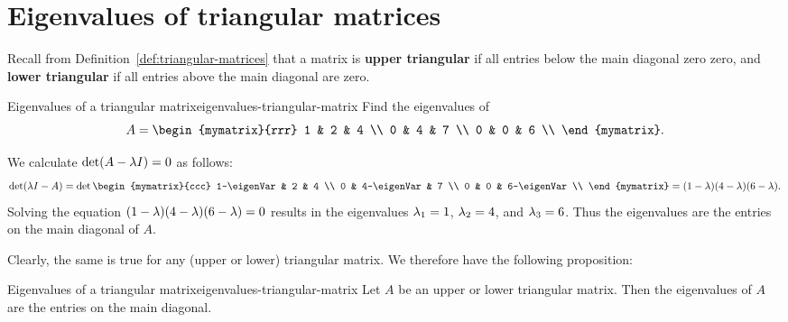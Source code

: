 \section{Eigenvalues of triangular matrices}

Recall from Definition~\ref{def:triangular-matrices} that a matrix is
\textbf{upper triangular} if all entries below the main diagonal zero
zero, and \textbf{lower triangular} if all entries above the main
diagonal are zero. 

\begin{example}{Eigenvalues of a triangular matrix}{eigenvalues-triangular-matrix}
  Find the eigenvalues of
  \begin{equation*}
    A=\begin{mymatrix}{rrr}
      1 & 2 & 4 \\
      0 & 4 & 7 \\
      0 & 0 & 6 \\
    \end{mymatrix}.
  \end{equation*}
\end{example}

\begin{solution}
  We calculate $\det(A - \lambda I) = 0$ as follows:
  \begin{eqnarray*}
    \det (\eigenVar I - A) =
    \det \begin{mymatrix}{ccc}
      1-\eigenVar & 2 & 4 \\
      0 & 4-\eigenVar & 7 \\
      0 & 0 & 6-\eigenVar \\
    \end{mymatrix} = (1-\eigenVar)(4-\eigenVar)(6-\eigenVar).
  \end{eqnarray*}
  Solving the equation $(1-\lambda)(4-\lambda)(6-\lambda) = 0$
  results in the eigenvalues $\lambda_1 = 1$, $\lambda_2 = 4$, and
  $\lambda_3 = 6$.  Thus the eigenvalues are the entries on the main
  diagonal of $A$.
\end{solution}

Clearly, the same is true for any (upper or lower) triangular
matrix. We therefore have the following proposition:

\begin{proposition}{Eigenvalues of a triangular matrix}{eigenvalues-triangular-matrix}
  Let $A$ be an upper or lower triangular matrix. Then the eigenvalues
  of $A$ are the entries on the main diagonal.
\end{proposition}
